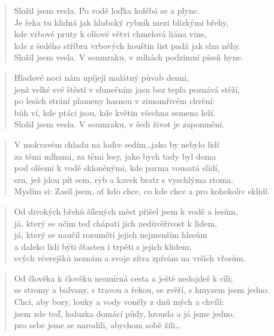 \documentclass{book}
\begin{document}
\begin{verse}
Složil jsem vesla. Po vodě loďka kolébá se a plyne.\\
Je řeka tu klidná jak hluboký rybník mezi blízkými břehy,\\
kde vrbové pruty k olšové větvi chmelová liána vine,\\
kde z šedého stříbra vrbových houštin list padá jak slza něhy.\\
Složil jsem vesla. V soumraku, v mlhách podzimní píseň hyne.
\end{verse}
\begin{verse}
Hladové noci nám upíjejí malátný půvab denní,\\
jenž velké své štěstí v slunečním jasu bez tepla poznává stěží,\\
po lesích strání plameny hasnou v zimomřivém chvění:\\
bůh ví, kde ptáci jsou, kde květin všechna semena leží.\\
Složil jsem vesla. V soumraku, v šedi život je zapomnění.
\end{verse}
\begin{verse}
V mokvavém chladu na loďce sedím\ldots jako by nebylo lidí\\
za těmi mlhami, za těmi lesy, jako bych tady byl doma\\
pod olšemi k vodě skloněnými, kde parma vousatá slídí,\\
srn, jež jdou pít sem, ryb a kavek bratr s vyschlýma rtoma.\\
Myslím si: Zasil jsem, ať kdo chce, co kde chce a pro kohokoliv sklidí.
\end{verse}
\begin{verse}
Od divokých břehů šílených měst přišel jsem k vodě a lesům,\\
já, který se učím teď chápati jich nedůvěřivost k lidem,\\
já, který se naučil rozuměti jejich nejmenším hlesům\\
a daleko lidí býti šťasten i trpěti s jejich klidem;\\
svých včerejšků neznám a svoje zítra zpívám na vrších vřesům.
\end{verse}
\begin{verse}
Od člověka k člověku nesmírná cesta a ještě nedojdeš k cíli;\\
se stromy a balvany, s travou a řekou, se zvěří, s hmyzem jsem jedno.\\
Chci, aby bory, louky a vody voněly z dnů mých a chvílí:\\
jsem zde teď, haluzka domácí půdy, hrouda a já jsme jedno,\\
pro sebe jsme se narodili, abychom sobě žili\ldots
\end{verse}
\end{document}
